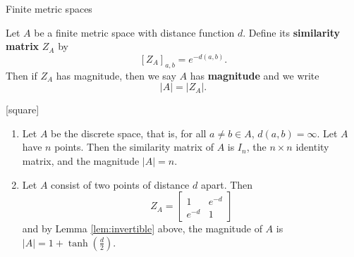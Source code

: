 \documentclass[12pt]{beamer}
\begin{document}
\begin{frame}[allowframebreaks]{Finite metric spaces}

\begin{definition}
Let $A$ be a finite metric space with distance function $d$. Define its \textbf{similarity matrix} $Z_A$ by
\begin{equation*}
\left[Z_A\right]_{a,b} = e^{-d(a,b)}.
\end{equation*}
Then if $Z_A$ has magnitude, then we say $A$ has \textbf{magnitude} and we write
\begin{equation*}
\vert A \vert = \vert Z_A \vert.
\end{equation*}
\end{definition}

\framebreak

\begin{example}
[square]
\begin{enumerate}
\item Let $A$ be the discrete space, that is, for all $a\neq b \in A$, $d(a,b) = \infty$. Let $A$ have $n$ points. Then the similarity matrix of $A$ is $I_n$, the $n\times n$ identity matrix, and the magnitude $\vert A \vert = n$.
\item Let $A$ consist of two points of distance $d$ apart. Then
\begin{equation*}
Z_A = \begin{bmatrix} 1 & e^{-d} \\ e^{-d} & 1 \end{bmatrix}
\end{equation*}
and by Lemma \ref{lem:invertible} above, the magnitude of $A$ is $\vert A \vert = 1 + \tanh\left(\frac{d}{2}\right)$.
\end{enumerate}
\end{example}

\end{frame}
\end{document}
